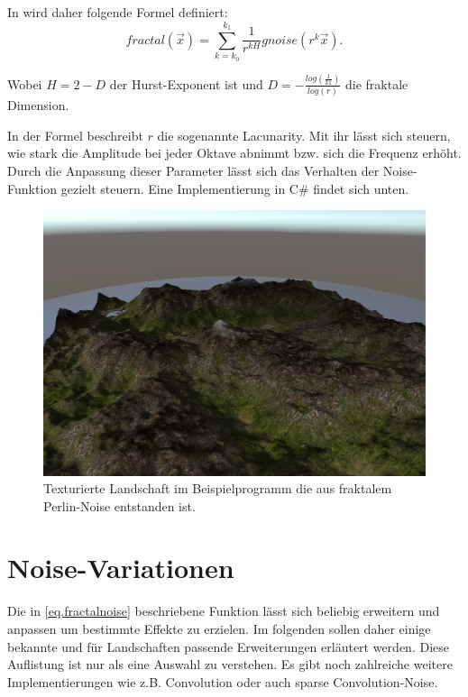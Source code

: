 In \cite{Saupe} wird daher folgende Formel definiert:
\begin{equation} \label{eq.fractalnoise}
	fractal(\vec{x}) = \sum_{k=k_0}^{k_1}\frac{1}{r^{kH}}gnoise(r^k\vec{x}).
\end{equation}

Wobei $H=2-D$ der Hurst-Exponent ist\cite{tuMuenchen} und %
$D=-\frac{log(\frac{1}{k1})}{log(r)}$\cite{fraktDim} die fraktale Dimension.

In der Formel beschreibt $r$ die sogenannte Lacunarity. Mit ihr lässt sich steuern, wie stark die Amplitude bei jeder Oktave abnimmt bzw. sich die Frequenz erhöht.
Durch die Anpassung dieser Parameter lässt sich das Verhalten der Noise-Funktion gezielt steuern. Eine Implementierung in C\# findet sich unten.

\begin{figure}
	\centering
	\includegraphics[width=\textwidth]{images/perlin_rendered.png}
	\caption{Texturierte Landschaft im Beispielprogramm die aus fraktalem Perlin-Noise entstanden ist.}\label{img.perlinRendered}
\end{figure}



\section{Noise-Variationen}\label{NoiseVariationen} %
Die in \ref{eq.fractalnoise} beschriebene Funktion lässt sich beliebig erweitern und anpassen um bestimmte Effekte zu erzielen. Im folgenden sollen daher einige bekannte und für Landschaften passende Erweiterungen erläutert werden. Diese Auflistung ist nur als eine Auswahl zu verstehen. Es gibt noch zahlreiche weitere Implementierungen wie z.B. Convolution oder auch sparse Convolution-Noise\cite{texturingAndModeling}.

